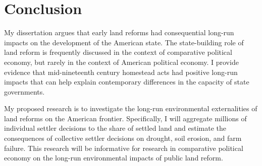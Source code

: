 \chapter{Conclusion}

My dissertation argues that early land reforms had consequential long-run impacts on the development of the American state. The state-building role of land reform is frequently discussed in the context of comparative political economy, but rarely in the context of American political economy. I provide evidence that mid-nineteenth century homestead acts had positive long-run impacts that can help explain contemporary differences in the capacity of state governments.

My proposed research is to investigate the long-run environmental externalities of land reforms on the American frontier. Specifically, I will aggregate millions of individual settler decisions to the share of settled land and estimate the consequences of collective settler decisions on drought, soil erosion, and farm failure. This research will be informative for research in comparative political economy on the long-run environmental impacts of public land reform.


%
%
%

